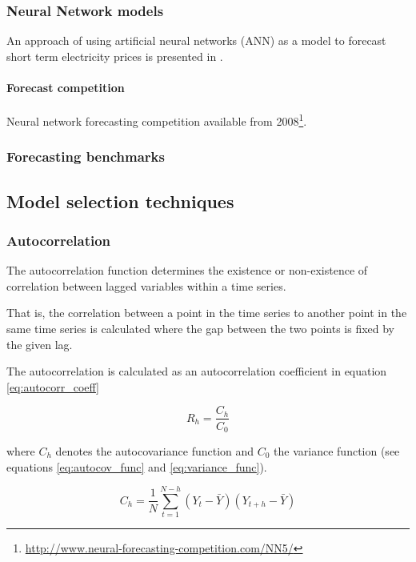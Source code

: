 \subsubsection{Neural Network models}

An approach of using artificial neural networks (ANN) as a model to forecast short term electricity prices is presented in \cite{szkuta1999electricity}. 


\paragraph{Forecast competition}

Neural network forecasting competition available from 2008\footnote{\url{http://www.neural-forecasting-competition.com/NN5/}}. 




\subsubsection{Forecasting benchmarks}



\subsection{Model selection techniques}


\subsubsection{Autocorrelation}

The autocorrelation function determines the existence or non-existence of correlation between lagged variables within a time series. 

That is, the correlation between a point in the time series to another point in the same time series is calculated where the gap between the two points is fixed by the given lag. 

The autocorrelation is calculated as an autocorrelation coefficient in equation \ref{eq:autocorr_coeff}

\begin{equation}
R_h = \frac{C_h}{C_0}
\label{eq:autocorr_coeff}
\end{equation}


where $C_h$ denotes the autocovariance function and $C_0$ the variance function 
(see equations \ref{eq:autocov_func} and \ref{eq:variance_func}). 


\begin{equation}
C_h = \frac{1}{N} \sum\limits_{t=1}^{N-h} (Y_t - \bar{Y}) (Y_{t+h} - \bar{Y})
\label{eq:autocov_func}
\end{equation}


